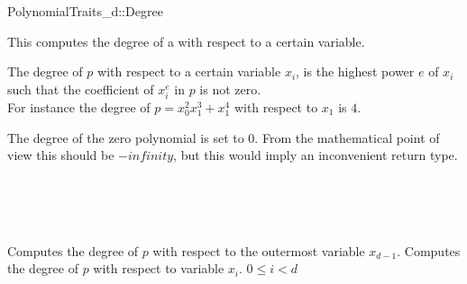 \begin{ccRefConcept}{PolynomialTraits_d::Degree}

\ccDefinition

This  computes the degree 
of a  with respect to a certain variable. 

The degree of $p$ with respect to a certain variable $x_i$, 
is the highest power $e$ of $x_i$ such that the coefficient of $x_i^{e}$ in 
$p$ is not zero.\\
For instance the degree of $p = x_0^2x_1^3+x_1^4$ with respect to $x_1$ is $4$.

The degree of the zero polynomial is set to $0$. 
From the mathematical point of view this should 
be $-infinity$, but this would imply an inconvenient return type. 

 

\ccRefines 
{}\\
\\
\\


\ccTypes


\ccGlue
{}

\ccOperations
{}
         {Computes the degree of $p$ with respect to the outermost variable $x_{d-1}$.}
         {Computes the degree of $p$ with respect to variable $x_i$.
         \ccPrecond $0 \leq i  < d$
         }


\ccSeeAlso

\\
\\
\\

\end{ccRefConcept}
